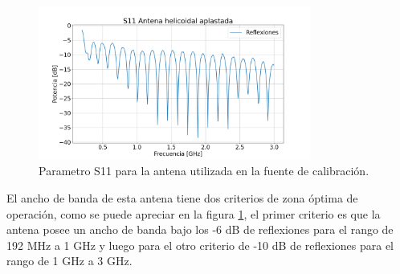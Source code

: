 \begin{figure}
    \centering
    \includegraphics[width=0.8\textwidth]{img/s11Paleta}
    \caption{Parametro S11 para la antena utilizada en la fuente de calibración.}
    \label{fig:s11estrella}
\end{figure}

El ancho de banda de esta antena tiene dos criterios de zona óptima de operación, como se puede apreciar en la figura \ref{fig:s11estrella}, el primer criterio es que la antena posee un ancho de banda bajo los -6 dB de reflexiones para el rango de 192 MHz a 1 GHz y luego para el otro criterio de -10 dB de reflexiones para el rango de 1 GHz a 3 GHz.\\

